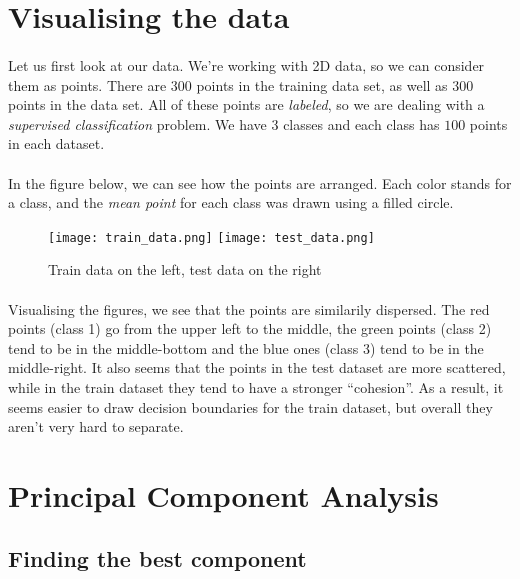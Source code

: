 \section{Visualising the data}
\paragraph{}
Let us first look at our data.
We're working with 2D data, so we can consider them as points.
There are $300$ points in the training data set, as well as $300$ points in the data set.
All of these points are \emph{labeled}, so we are dealing with a \emph{supervised classification} problem.
We have 3 classes and each class has $100$ points in each dataset.

\paragraph{}
In the figure below, we can see how the points are arranged.
Each color stands for a class, and the \emph{mean point} for each class was drawn using a filled circle.

\begin{figure}[H]
    \centering
    \texttt{[image: train\_data.png]}
    \texttt{[image: test\_data.png]}
    \caption{Train data on the left, test data on the right}
    \label{figure:data}
\end{figure}

\paragraph{}
Visualising the figures, we see that the points are similarily dispersed.
The red points (class 1) go from the upper left to the middle, the green points (class 2) tend to be in the middle-bottom and the blue ones (class 3) tend to be in the middle-right.
It also seems that the points in the test dataset are more scattered, while in the train dataset they tend to have a stronger ``cohesion''.
As a result, it seems easier to draw decision boundaries for the train dataset, but overall they aren't very hard to separate.

\clearpage

\section{Principal Component Analysis}

\subsection{Finding the best component}
